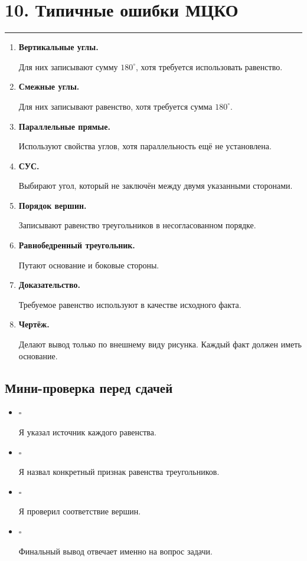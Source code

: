 \documentclass[a4paper,12pt]{article}
\newcommand{\sectionline}{
  \par
  \vspace{0.2em}
  \textcolor{lightline}{\rule{\linewidth}{0.8pt}}
  \par
  \vspace{0.35em}
}
\newcommand{\key}[1]{
  \textcolor{darkaccent}{\textbf{#1}}
}
\newcommand{\checkitem}{
  \textcolor{accent}{$\square$}\,
}
\begin{document}
\section*{10. Типичные ошибки МЦКО}
\sectionline

\begin{enumerate}[label=\arabic*)]

\item
\key{Вертикальные углы.}

Для них записывают сумму $180^\circ$,
хотя требуется использовать равенство.

\item
\key{Смежные углы.}

Для них записывают равенство,
хотя требуется сумма $180^\circ$.

\item
\key{Параллельные прямые.}

Используют свойства углов,
хотя параллельность ещё не установлена.

\item
\key{СУС.}

Выбирают угол,
который не заключён между двумя указанными сторонами.

\item
\key{Порядок вершин.}

Записывают равенство треугольников
в несогласованном порядке.

\item
\key{Равнобедренный треугольник.}

Путают основание и боковые стороны.

\item
\key{Доказательство.}

Требуемое равенство используют в качестве исходного факта.

\item
\key{Чертёж.}

Делают вывод только по внешнему виду рисунка.
Каждый факт должен иметь основание.

\end{enumerate}

\subsection*{Мини-проверка перед сдачей}

\begin{itemize}

\item
\checkitem
Я указал источник каждого равенства.

\item
\checkitem
Я назвал конкретный признак
равенства треугольников.

\item
\checkitem
Я проверил соответствие вершин.

\item
\checkitem
Финальный вывод отвечает
именно на вопрос задачи.

\end{itemize}
\end{document}
